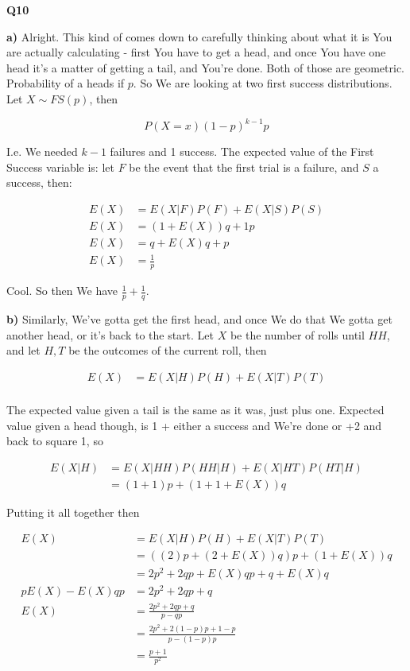 \documentclass{article}
\begin{document}
			\hfill
		
		\textbf{Q10}
		
			\textbf{a)} Alright. This kind of comes down to carefully thinking about what it is You are actually calculating - first You have to get a head, and once You have one head it's a matter of getting a tail, and You're done. Both of those are geometric. Probability of a heads if $p$. So We are looking at two first success distributions. Let $X\sim FS(p)$, then
				
			\[ P(X=x)(1-p)^{k-1}p \]
		
			I.e. We needed $k-1$ failures and 1 success. The expected value of the First Success variable is: let $F$ be the event that the first trial is a failure, and $S$ a success, then:
			
			\begin{align*}
			E(X) &= E(X|F)P(F) + E(X|S)P(S)\\
			E(X) &= (1+E(X))q + 1p\\
			E(X) &= q + E(X)q + p\\
			E(X) &= \frac{1}{p}
			\end{align*}
		
			Cool. So then We have $\frac{1}{p} + \frac{1}{q}$. 
		
			\textbf{b)} Similarly, We've gotta get the first head, and once We do that We gotta get another head, or it's back to the start. Let $X$ be the number of rolls until $HH$, and let $H, T$ be the outcomes of the current roll, then
			
			\begin{align*}
			E(X) &= E(X|H)P(H) + E(X|T)P(T)\\
			\end{align*}
		
			The expected value given a tail is the same as it was, just plus one. Expected value given a head though, is 1 + either a success and We're done or +2 and back to square 1, so
			
			\begin{align*}
			E(X|H) &= E(X|HH)P(HH|H) + E(X|HT)P(HT|H)\\
			&= (1+1)p + (1+1+E(X))q
			\end{align*}
		
			Putting it all together then
			
			\begin{align*}
			E(X) &= E(X|H)P(H) + E(X|T)P(T)\\
			&= ((2)p + (2+E(X))q)p + (1+E(X))q\\
			&= 2p^2 + 2qp + E(X)qp + q + E(X)q\\
			pE(X) - E(X)qp &= 2p^2 + 2qp + q\\
			E(X) &= \frac{2p^2+2qp + q}{p-qp}\\
			&= \frac{2p^2+2(1-p)p + 1-p}{p-(1-p)p}\\
			&= \frac{p + 1}{p^2}\\
			\end{align*}
		
\end{document}
